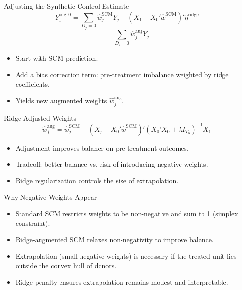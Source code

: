\documentclass{beamer}
\begin{document}
\begin{frame}{Adjusting the Synthetic Control Estimate}
\small
\[
Y_1^{\text{aug},0} = \sum_{D_j=0} \widehat{w}_j^{\text{SCM}} Y_j + (X_1 - X_0' \widehat{w}^{\text{SCM}})' \widehat{\eta}^{\text{ridge}}
\]
\[
= \sum_{D_j=0} \widehat{w}_j^{\text{aug}} Y_j
\]
\begin{itemize}
  \item Start with SCM prediction.
  \item Add a bias correction term: pre-treatment imbalance weighted by ridge coefficients.
  \item Yields new augmented weights $\widehat{w}_j^{\text{aug}}$.
\end{itemize}
\end{frame}

\begin{frame}{Ridge-Adjusted Weights}
\small
\[
\widehat{w}_j^{\text{aug}} = \widehat{w}_j^{\text{SCM}} + (X_j - X_0' \widehat{w}^{\text{SCM}})' (X_0'X_0 + \lambda I_{T_0})^{-1} X_1
\]
\begin{itemize}
  \item Adjustment improves balance on pre-treatment outcomes.
  \item Tradeoff: better balance vs. risk of introducing negative weights.
  \item Ridge regularization controls the size of extrapolation.
\end{itemize}
\end{frame}

\begin{frame}{Why Negative Weights Appear}
\small
\begin{itemize}
  \item Standard SCM restricts weights to be non-negative and sum to 1 (simplex constraint).
  \item Ridge-augmented SCM relaxes non-negativity to improve balance.
  \item Extrapolation (small negative weights) is necessary if the treated unit lies outside the convex hull of donors.
  \item Ridge penalty ensures extrapolation remains modest and interpretable.
\end{itemize}
\end{frame}
\end{document}
